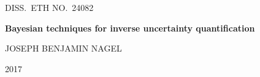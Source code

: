 \begin{titlepage}

\begin{center}

\thispagestyle{allempty}

{\large DISS.\ ETH NO.\ 24082 \par}

\vfill

\begin{Huge}
\textbf{Bayesian techniques for inverse uncertainty quantification} \par
\end{Huge}

\vspace{2cm}

\begin{large}
JOSEPH BENJAMIN NAGEL \par
\end{large}

\vfill

{\large 2017 \par}

\end{center}

\end{titlepage}